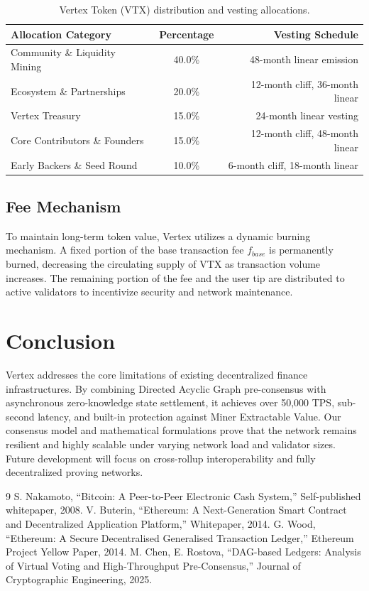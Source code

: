 \documentclass[10pt]{article}
\begin{document}
\begin{table}[H]
\centering
\sffamily
\small
\begin{tabularx}{0.9\textwidth}{Xcr}
\toprule
\textbf{Allocation Category} & \textbf{Percentage} & \textbf{Vesting Schedule} \\
\midrule
Community \& Liquidity Mining & 40.0\% & 48-month linear emission \\
Ecosystem \& Partnerships & 20.0\% & 12-month cliff, 36-month linear \\
Vertex Treasury & 15.0\% & 24-month linear vesting \\
Core Contributors \& Founders & 15.0\% & 12-month cliff, 48-month linear \\
Early Backers \& Seed Round & 10.0\% & 6-month cliff, 18-month linear \\
\bottomrule
\end{tabularx}
\caption{Vertex Token (VTX) distribution and vesting allocations.}
\label{tab:tokenomics}
\end{table}

\subsection{Fee Mechanism}
To maintain long-term token value, Vertex utilizes a dynamic burning mechanism. A fixed portion of the base transaction fee $f_{base}$ is permanently burned, decreasing the circulating supply of VTX as transaction volume increases. The remaining portion of the fee and the user tip are distributed to active validators to incentivize security and network maintenance.

\section{Conclusion}
Vertex addresses the core limitations of existing decentralized finance infrastructures. By combining Directed Acyclic Graph pre-consensus with asynchronous zero-knowledge state settlement, it achieves over 50,000 TPS, sub-second latency, and built-in protection against Miner Extractable Value. Our consensus model and mathematical formulations prove that the network remains resilient and highly scalable under varying network load and validator sizes. Future development will focus on cross-rollup interoperability and fully decentralized proving networks.

\begin{thebibliography}{9}
S. Nakamoto, ``Bitcoin: A Peer-to-Peer Electronic Cash System,'' Self-published whitepaper, 2008.
V. Buterin, ``Ethereum: A Next-Generation Smart Contract and Decentralized Application Platform,'' Whitepaper, 2014.
G. Wood, ``Ethereum: A Secure Decentralised Generalised Transaction Ledger,'' Ethereum Project Yellow Paper, 2014.
M. Chen, E. Rostova, ``DAG-based Ledgers: Analysis of Virtual Voting and High-Throughput Pre-Consensus,'' Journal of Cryptographic Engineering, 2025.
\end{thebibliography}
\end{document}
